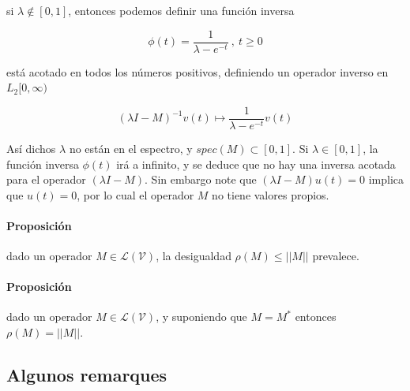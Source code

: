 si $\lambda \notin [0,1]$, entonces podemos definir una función inversa

\begin{equation*}
    \phi (t) = \frac{1}{\lambda - e^{-t}} \ , \ t\geq 0
\end{equation*}

está acotado en todos los números positivos, definiendo un operador inverso en $L_2[0,\infty)$

\begin{equation*}
    (\lambda I - M)^{-1} v(t) \mapsto  \frac{1}{\lambda - e^{-t}}  v(t) 
\end{equation*}

Así dichos $\lambda$ no están en el espectro, y $spec(M) \subset [0,1]$. Si $\lambda \in [0,1]$, la función inversa $\phi (t)$ irá a infinito, y se deduce que no hay una inversa acotada para el operador $(\lambda I - M)$. Sin embargo note que $(\lambda I - M)u(t) = 0$ implica que $u(t) = 0$, por lo cual el operador $M$ no tiene valores propios. \\

\paragraph{Proposición} dado un operador $M \in \mathcal{L} (\mathcal{V})$, la desigualdad $\rho(M) \leq ||M||$ prevalece.



\paragraph{Proposición} dado un operador $M \in \mathcal{L} (\mathcal{V})$, y suponiendo que $M = M^{*}$ entonces $\rho(M) = ||M||$.

\subsection{Algunos remarques}

